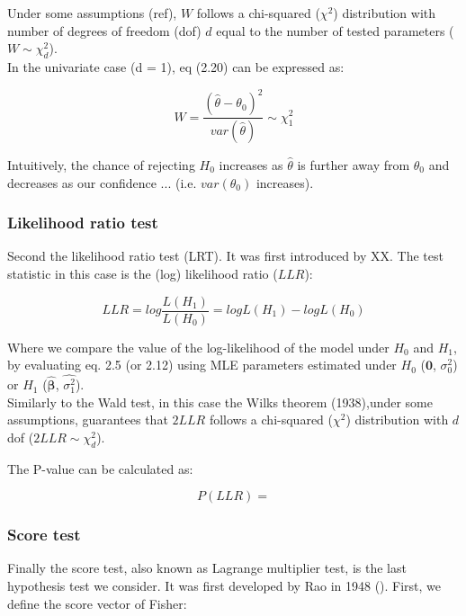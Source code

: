 Under some assumptions (ref), $W$ follows a chi-squared ($\chi^2$) distribution with number of degrees of freedom (dof) $d$ equal to the number of tested parameters ($W \sim \chi^2_d $).\\

In the univariate case (d = 1), eq (2.20) can be expressed as:

\begin{equation}
    W = \frac{(\hat{\theta}-\theta_0)^2}{var(\hat{\theta})} \sim \chi^2_1
\end{equation}

Intuitively, the chance of rejecting $H_0$ increases as $\hat{\theta}$ is further away from $\theta_0$ and decreases as our confidence ... (i.e. $var(\theta_0)$ increases).


\subsubsection{Likelihood ratio test}

Second the likelihood ratio test (LRT).
It was first introduced by XX. 
The test statistic in this case is the (log) likelihood ratio ($LLR$):

\begin{equation}\label{eq18:log_likelihood_ratio}
LLR = log \frac{L(H_1)}{L(H_0)} = logL(H_1) - logL(H_0) 
\end{equation}

Where we compare the value of the log-likelihood of the model under $H_0$ and $H_1$, by evaluating eq. 2.5 (or 2.12) using MLE parameters estimated under $H_0$ ($\mathbf{0}$, $\sigma_0^2$) or $H_1$ ($\hat{\boldsymbol{\beta}}$, $\hat{\sigma_1^2}$).  \\

Similarly to the Wald test, in this case the Wilks theorem (1938),under some assumptions, guarantees that $2LLR$ follows a chi-squared ($\chi^2$) distribution with $d$ dof ($2LLR \sim \chi^2_d$).

The P-value can be calculated as:

\begin{equation}
    P(LLR) = 
\end{equation}

\subsubsection{Score test}

Finally the score test, also known as Lagrange multiplier test, is the last hypothesis test we consider. 
It was first developed by Rao in 1948 (\cite{rao1948large}).
First, we define the score vector of Fisher:

